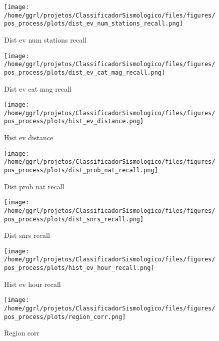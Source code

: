 
\begin{figure}[H]
    \centering
    \texttt{[image: /home/ggrl/projetos/ClassificadorSismologico/files/figures/pos\_process/plots/dist\_ev\_num\_stations\_recall.png]}
    \caption{Dist ev num stations recall}
    \label{fig:dist_ev_num_stations_recall}
\end{figure}


\begin{figure}[H]
    \centering
    \texttt{[image: /home/ggrl/projetos/ClassificadorSismologico/files/figures/pos\_process/plots/dist\_ev\_cat\_mag\_recall.png]}
    \caption{Dist ev cat mag recall}
    \label{fig:dist_ev_cat_mag_recall}
\end{figure}


\begin{figure}[H]
    \centering
    \texttt{[image: /home/ggrl/projetos/ClassificadorSismologico/files/figures/pos\_process/plots/hist\_ev\_distance.png]}
    \caption{Hist ev distance}
    \label{fig:hist_ev_distance}
\end{figure}


\begin{figure}[H]
    \centering
    \texttt{[image: /home/ggrl/projetos/ClassificadorSismologico/files/figures/pos\_process/plots/dist\_prob\_nat\_recall.png]}
    \caption{Dist prob nat recall}
    \label{fig:dist_prob_nat_recall}
\end{figure}


\begin{figure}[H]
    \centering
    \texttt{[image: /home/ggrl/projetos/ClassificadorSismologico/files/figures/pos\_process/plots/dist\_snrs\_recall.png]}
    \caption{Dist snrs recall}
    \label{fig:dist_snrs_recall}
\end{figure}


\begin{figure}[H]
    \centering
    \texttt{[image: /home/ggrl/projetos/ClassificadorSismologico/files/figures/pos\_process/plots/hist\_ev\_hour\_recall.png]}
    \caption{Hist ev hour recall}
    \label{fig:hist_ev_hour_recall}
\end{figure}


\begin{figure}[H]
    \centering
    \texttt{[image: /home/ggrl/projetos/ClassificadorSismologico/files/figures/pos\_process/plots/region\_corr.png]}
    \caption{Region corr}
    \label{fig:region_corr}
\end{figure}


